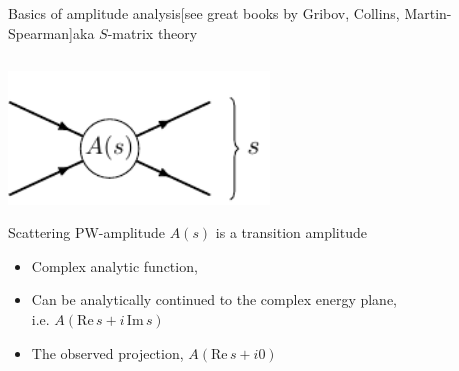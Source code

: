 \documentclass[aspectratio=169]{beamer}
\newcommand{\paper}[1]{{\scriptsize[#1]}}
\begin{document}
\begin{frame}{Basics of amplitude analysis\hfill\paper{see great books by Gribov, Collins, Martin-Spearman}}{aka $S$-matrix theory}
    \begin{columns}
        \begin{column}{0.48\textwidth}
            \centering
            \includegraphics[width=0.6\textwidth]{inline-figs/scattering.pdf}
            \begin{exampleblock}{Scattering PW-amplitude}
                $A(s)$ is a transition amplitude
                \begin{itemize}
                    \item Complex analytic function,
                    \item Can be analytically continued to the complex energy plane,\\
                    i.e. $A(\mathrm{Re}\,s + i\,\mathrm{Im}\,s)$
                    \item The observed projection, $A(\mathrm{Re}\,s + i0)$
                \end{itemize}
            \end{exampleblock}
        \end{column}
        \begin{column}{0.5\textwidth}
            \vspace{-5mm}
            \begin{overlayarea}{\textwidth}{0.55\textheight}

\end{overlayarea}
\end{column}
\end{columns}
\end{frame}
\end{document}
